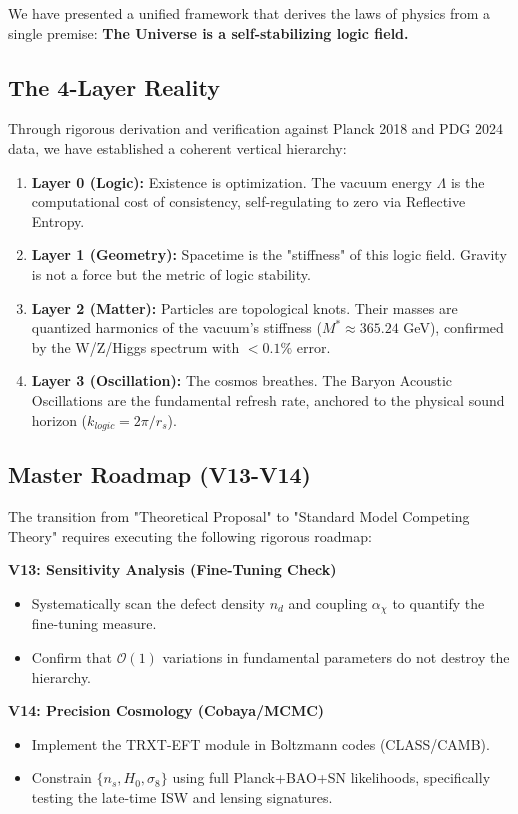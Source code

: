 \documentclass[a4paper,12pt]{article}
\begin{document}
We have presented a unified framework that derives the laws of physics from a single premise: \textbf{The Universe is a self-stabilizing logic field.}

\subsection{The 4-Layer Reality}
Through rigorous derivation and verification against Planck 2018 and PDG 2024 data, we have established a coherent vertical hierarchy:
\begin{enumerate}
    \item \textbf{Layer 0 (Logic):} Existence is optimization. The vacuum energy $\Lambda$ is the computational cost of consistency, self-regulating to zero via Reflective Entropy.
    \item \textbf{Layer 1 (Geometry):} Spacetime is the "stiffness" of this logic field. Gravity is not a force but the metric of logic stability.
    \item \textbf{Layer 2 (Matter):} Particles are topological knots. Their masses are quantized harmonics of the vacuum's stiffness ($M^* \approx 365.24$ GeV), confirmed by the W/Z/Higgs spectrum with $<0.1\%$ error.
    \item \textbf{Layer 3 (Oscillation):} The cosmos breathes. The Baryon Acoustic Oscillations are the fundamental refresh rate, anchored to the physical sound horizon ($k_{logic} = 2\pi/r_s$).
\end{enumerate}

\subsection{Master Roadmap (V13-V14)}
The transition from "Theoretical Proposal" to "Standard Model Competing Theory" requires executing the following rigorous roadmap:

\textbf{V13: Sensitivity Analysis (Fine-Tuning Check)}
\begin{itemize}
    \item Systematically scan the defect density $n_d$ and coupling $\alpha_\chi$ to quantify the fine-tuning measure.
    \item Confirm that $\mathcal{O}(1)$ variations in fundamental parameters do not destroy the hierarchy.
\end{itemize}

\textbf{V14: Precision Cosmology (Cobaya/MCMC)}
\begin{itemize}
    \item Implement the TRXT-EFT module in Boltzmann codes (CLASS/CAMB).
    \item Constrain $\{n_s, H_0, \sigma_8\}$ using full Planck+BAO+SN likelihoods, specifically testing the late-time ISW and lensing signatures.
\end{itemize}
\end{document}
